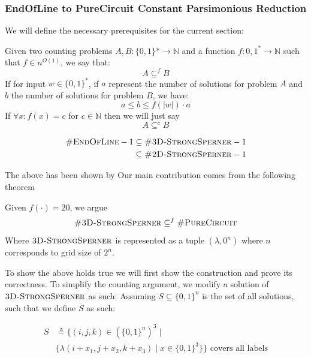 \subsubsection{EndOfLine to PureCircuit Constant Parsimonious Reduction}

We will define the necessary prerequisites for the current section:

\begin{definition}
    Given two counting problems $A, B : \{0,1\}* \to \mathbb{N}$
    and a function $f : {0,1}^{*} \to \mathbb{N}$ such that $f \in n^{O(1)}$, we
    say that:
    $$
    A \subseteq^f B
    $$
    If for input $w \in \{0,1\}^*$, if $a$ represent the number of solutions
    for problem $A$ and $b$ the number of solutions for problem $B$, we have:
    $$
    a \leq b \leq f(|w|) \cdot a
    $$
    If $\forall x : f(x) = c$ for $c \in \mathbb{N}$ then we will just say 
    $$
    A \subseteq^c B
    $$
\end{definition}

\begin{proposition}
    \begin{align*}
    \textnormal{\textsc{\#EndOfLine}} -1 &\subseteq \textnormal{\textsc{\#3D-StrongSperner}}  -1\\
    &\subseteq \textnormal{\textsc{\#2D-StrongSperner}} -1 \\
    \end{align*}
\end{proposition}

The above has been shown by %
Our main contribution comes from the following theorem


\begin{theorem}
    Given $f(\cdot) = 20$, we argue
    $$
    \textnormal{\textsc{\#3D-StrongSperner}} \subseteq^f \textnormal{\textsc{\#PureCircuit}}
    $$
    Where $\textnormal{\textsc{3D-StrongSperner}}$ is represented as a tuple $(\lambda, 0^n)$
    where $n$ corresponds to grid size of $2^n$.
\end{theorem}

To show the above holds true we will first show the construction and
prove its correctness.
To simplify the counting argument, we modify a solution of $\textsc{3D-StrongSperner}$
as such: Assuming $S \subseteq \{0,1\}^n$ is the set of all solutions, such that we define $S$ as such:

\begin{align*}
    S &\triangleq \Big\{(i,j,k) \in (\{0,1\}^{n})^3 \mid  \\
      &\{\lambda(i + x_1, j + x_2, k + x_3) \mid x \in \{0,1\}^3 \}\Big\} \text{ covers all labels}
\end{align*}

